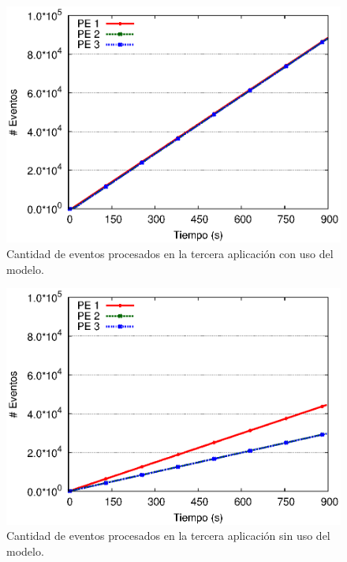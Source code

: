 \begin{figure}[!ht]
\centering
    \includegraphics[scale=0.75]{images/exp/app3/cm/logical/eventCount.eps}
    \caption{Cantidad de eventos procesados en la tercera aplicaci\'on con uso del modelo.}
    \label{fig:app3-eventCount-cm}
\end{figure}

\begin{figure}[!ht]
\centering
    \includegraphics[scale=0.75]{images/exp/app3/sm/logical/eventCount.eps}
    \caption{Cantidad de eventos procesados en la tercera aplicaci\'on sin uso del modelo.}
    \label{fig:app3-eventCount-sm}
\end{figure}


